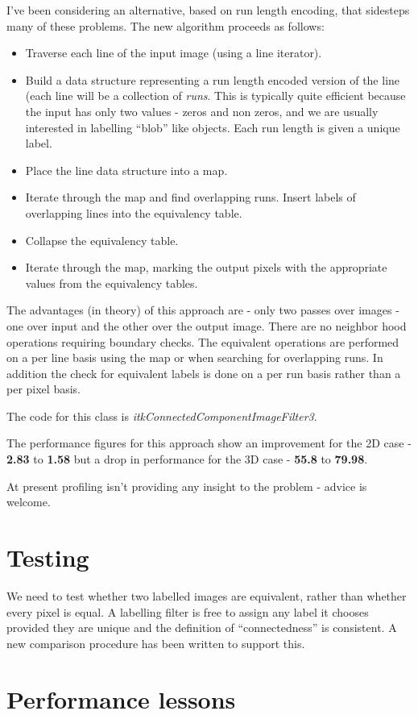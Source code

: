 \documentclass[IJ]{cesj}
\begin{document}
I've been considering an alternative, based on run length encoding,
that sidesteps many of these problems. The new algorithm proceeds as follows:
\begin{itemize}
\item Traverse each line of the input image (using a line iterator).
\item Build a data structure representing a run length encoded version
 of the line (each line will be a collection of {\em runs}. This is
 typically quite efficient because the input has only two values -
 zeros and non zeros, and we are usually interested in labelling
 ``blob'' like objects. Each run length is given a unique label.
\item Place the line data structure into a map.
\item Iterate through the map and find overlapping runs. Insert labels 
of overlapping lines into the equivalency table.
\item Collapse the equivalency table.
\item Iterate through the map, marking the output pixels with the appropriate values from the equivalency tables.
\end{itemize}

The advantages (in theory) of this approach are - only two passes over
images - one over input and the other over the output image. There are
no neighbor hood operations requiring boundary checks. The equivalent
operations are performed on a per line basis using the map or when
searching for overlapping runs. In addition the check for equivalent
labels is done on a per run basis rather than a per pixel basis.

The code for this class is {\em itkConnectedComponentImageFilter3}.

The performance figures for this approach show an improvement for the
2D case - {\bf 2.83} to {\bf 1.58} but a drop in performance for the
3D case - {\bf 55.8} to {\bf 79.98}. 

At present profiling isn't providing any insight to the problem -
advice is welcome.

\section{Testing}
We need to test whether two labelled images are equivalent, rather
than whether every pixel is equal. A labelling filter is free to
assign any label it chooses provided they are unique and the
definition of ``connectedness'' is consistent. A new comparison
procedure has been written to support this.

\section{Performance lessons}
\label{sect:performance_lessons}
\end{document}
